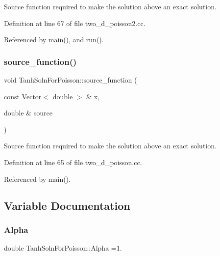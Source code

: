 Source function required to make the solution above an exact solution. 



Definition at line 67 of file two\+\_\+d\+\_\+poisson2.\+cc.



Referenced by main(), and run().

\mbox{\label{namespaceTanhSolnForPoisson_a967bc28320e02534beb714846b63e251}} 
\subsubsection{\texorpdfstring{source\+\_\+function()}{source\_function()}}
{\footnotesize\ttfamily void Tanh\+Soln\+For\+Poisson\+::source\+\_\+function (\begin{DoxyParamCaption}\item[{const Vector$<$ double $>$ \&}]{x,  }\item[{double \&}]{source }\end{DoxyParamCaption})}



Source function required to make the solution above an exact solution. 



Definition at line 65 of file two\+\_\+d\+\_\+poisson.\+cc.



Referenced by main().



\subsection{Variable Documentation}
\mbox{\label{namespaceTanhSolnForPoisson_ae676ccd186d5df119cce811596d949c1}} 
\subsubsection{\texorpdfstring{Alpha}{Alpha}}
{\footnotesize\ttfamily double Tanh\+Soln\+For\+Poisson\+::\+Alpha =1.}



